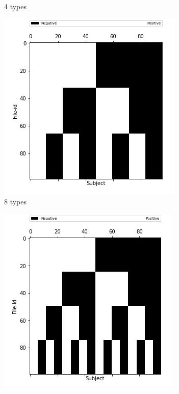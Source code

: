 \documentclass[10pt, conference, compsocconf]{IEEEtran}
\begin{document}
\begin{figure}
\begin{subfigure}[b]{0.4\linewidth}
                  \caption{4 types}
        \end{subfigure}
                \begin{subfigure}[b]{0.4\linewidth}
                  \includegraphics[width=\columnwidth]{data/Utility_Matrix/Synthetic/synthetic_subject_types/8_SubjectType_utility_matrix.png}
                  \caption{8 types}
        \end{subfigure}
                \begin{subfigure}[b]{0.4\linewidth}
                  \includegraphics[width=\columnwidth]{data/Utility_Matrix/Synthetic/synthetic_subject_types/16_SubjectType_utility_matrix.png}

\end{subfigure}
\end{figure}
\end{document}
